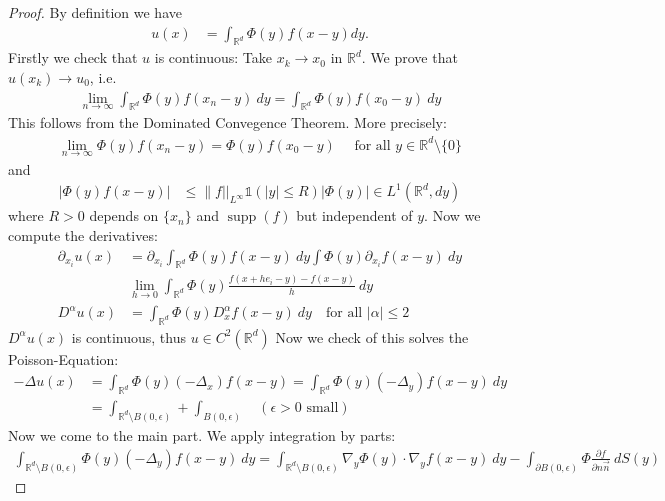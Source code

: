 \documentclass{report}
\theoremstyle{tommy}
\begin{document}
\begin{proof}
  By definition we have
  \begin{align*}
    u(x) &= \int_{\mathbb{R}^d} \Phi(y) f(x-y) dy.
  \end{align*}
  Firstly we check that \(u\) is continuous: Take \(x_k \to x_0\) in \(\mathbb{R}^d\). We prove that \(u(x_k) \to u_0\), i.e.
  \begin{align*}
    \lim_{n \to \infty} \int_{\mathbb{R}^d} \Phi(y) f(x_n - y) \ dy = \int_{\mathbb{R}^d} \Phi(y) f(x_0 - y) \ dy
  \end{align*}
  This follows from the Dominated Convegence Theorem. More precisely:
  \begin{align*}
    \lim_{n \to \infty} \Phi(y) f(x_n -y) = \Phi(y) f(x_0 - y) \quad \text{ for all } y \in \mathbb{R}^d \setminus \{0\}
  \end{align*}
  and 
  \begin{align*}
    |\Phi(y) f(x-y)| &\le \| f ||_{L^\infty} \mathbb{1}(|y| \le R) |\Phi(y)| \in L^1(\mathbb{R}^d, dy)
  \end{align*}
  where \(R > 0\) depends on \(\{x_n\}\) and \(\operatorname{supp}(f)\) but independent of \(y\). Now we compute the derivatives:
  \begin{align*}
    \partial_{x_i} u(x) &= \partial_{x_i} \int_{\mathbb{R}^d} \Phi(y) f(x-y) \ dy \int \Phi(y) \partial_{x_i} f(x-y) \ dy \\
    &\lim_{h \to 0} \int_{\mathbb{R}^d} \Phi(y) \frac{f(x + h e_i - y) - f(x-y)}{h} \ dy \\
    D^\alpha u(x) &= \int_{\mathbb{R}^d} \Phi(y) D_x^\alpha f(x-y) \ dy \quad \text{for all } |\alpha| \le 2
  \end{align*}
  \(D^\alpha u(x)\)  is continuous, thus \(u \in C^2(\mathbb{R}^d)\)
  Now we check of this solves the Poisson-Equation:
  \begin{align*}
    - \Delta u(x) 
    &= \int_{\mathbb{R}^d} \Phi(y) (-\Delta_x) f(x-y)
    = \int_{\mathbb{R}^d} \Phi(y) (-\Delta_y) f(x-y) \ dy \\
    &= \int_{\mathbb{R}^d \setminus B(0, \epsilon)} + \int_{B(0, \epsilon)} \quad (\epsilon > 0 \text{ small})
  \end{align*}
  Now we come to the main part. We apply integration by parts:
  \begin{align*}
    \int_{\mathbb{R}^d \setminus B(0, \epsilon)} \Phi(y)(- \Delta_y) f(x-y) \ dy
    = \int_{\mathbb{R}^d \setminus B(0, \epsilon)} \nabla_y \Phi(y) \cdot \nabla_y f(x-y) \ dy - \int_{\partial B(0, \epsilon)} \Phi \frac{\partial f}{\partial n \vec{n}} \ dS(y)
  \end{align*}


\end{proof}
\end{document}

